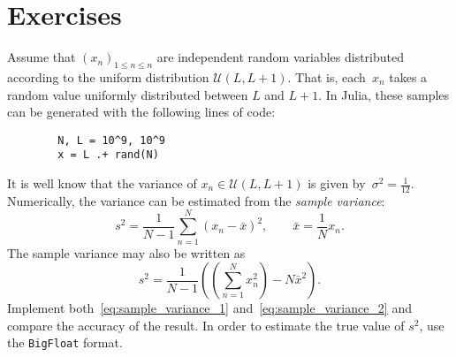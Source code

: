 \section{Exercises}%
\label{sec:exercises}

\begin{exercise}
    Assume that $(x_n)_{1 \leq n \leq n}$ are independent random variables distributed according to
    the uniform distribution $\mathcal U(L, L+1)$.
    That is, each~$x_n$ takes a random value uniformly distributed between $L$ and $L+1$.
    In Julia, these samples can be generated with the following lines of code:
    \begin{verbatim}
        N, L = 10^9, 10^9
        x = L .+ rand(N)
    \end{verbatim}
    It is well know that the variance of $x_n \in \mathcal U(L, L+1)$ is given by~$\sigma^2 = \frac{1}{12}$.
    Numerically, the variance can be estimated from the \emph{sample variance}:
    \begin{equation}
        \label{eq:sample_variance_1}
        s^2 = \frac{1}{N-1} \sum_{n=1}^{N} (x_n - \bar x)^2,
        \qquad \bar x = \frac{1}{N} x_n.
    \end{equation}
    The sample variance may also be written as
    \begin{equation}
        \label{eq:sample_variance_2}
        s^2 = \frac{1}{N-1} \left(\left(\sum_{n=1}^{N} x_n^2\right) - N \bar x^2 \right).
    \end{equation}
    Implement both~\eqref{eq:sample_variance_1} and~\eqref{eq:sample_variance_2}
    and compare the accuracy of the result.
    In order to estimate the true value of $s^2$,
    use the \texttt{BigFloat} format.
\end{exercise}


